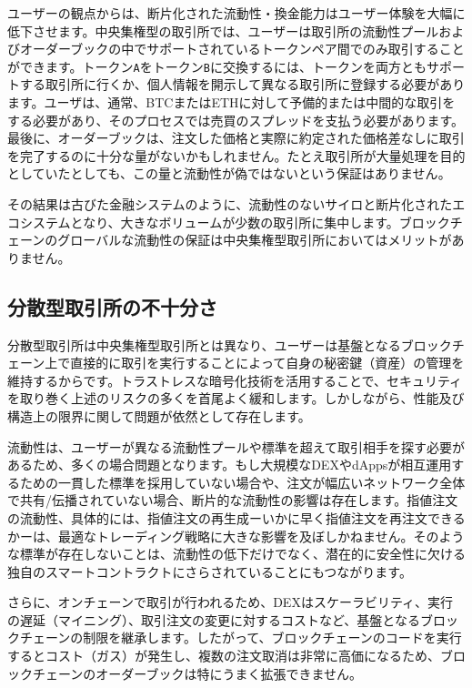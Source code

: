 \documentclass{article}
\begin{document}
\begin{multicols}{2}
ユーザーの観点からは、断片化された流動性・換金能力はユーザー体験を大幅に低下させます。中央集権型の取引所では、ユーザーは取引所の流動性プールおよびオーダーブックの中でサポートされているトークンペア間でのみ取引することができます。トークン\verb|A|をトークン\verb|B|に交換するには、トークンを両方ともサポートする取引所に行くか、個人情報を開示して異なる取引所に登録する必要があります。ユーザは、通常、BTCまたはETHに対して予備的または中間的な取引をする必要があり、そのプロセスでは売買のスプレッドを支払う必要があります。最後に、オーダーブックは、注文した価格と実際に約定された価格差なしに取引を完了するのに十分な量がないかもしれません。たとえ取引所が大量処理を目的としていたとしても、この量と流動性が偽ではないという保証はありません\cite{fakevolume}。

その結果は古びた金融システムのように、流動性のないサイロと断片化されたエコシステムとなり、大きなボリュームが少数の取引所に集中します。ブロックチェーンのグローバルな流動性の保証は中央集権型取引所においてはメリットがありません。

\subsection{分散型取引所の不十分さ}
分散型取引所は中央集権型取引所とは異なり、ユーザーは基盤となるブロックチェーン上で直接的に取引を実行することによって自身の秘密鍵（資産）の管理を維持するからです。トラストレスな暗号化技術を活用することで、セキュリティを取り巻く上述のリスクの多くを首尾よく緩和します。しかしながら、性能及び構造上の限界に関して問題が依然として存在します。

流動性は、ユーザーが異なる流動性プールや標準を超えて取引相手を探す必要があるため、多くの場合問題となります。もし大規模なDEXやdAppsが相互運用するための一貫した標準を採用していない場合や、注文が幅広いネットワーク全体で共有/伝播されていない場合、断片的な流動性の影響は存在します。指値注文の流動性、具体的には、指値注文の再生成ーいかに早く指値注文を再注文できるかーは、最適なトレーディング戦略に大きな影響を及ぼしかねません\cite{limitorderliquidity}。そのような標準が存在しないことは、流動性の低下だけでなく、潜在的に安全性に欠ける独自のスマートコントラクトにさらされていることにもつながります。

さらに、オンチェーンで取引が行われるため、DEXはスケーラビリティ、実行の遅延（マイニング）、取引注文の変更に対するコストなど、基盤となるブロックチェーンの制限を継承します。したがって、ブロックチェーンのコードを実行するとコスト（ガス）が発生し、複数の注文取消は非常に高価になるため、ブロックチェーンのオーダーブックは特にうまく拡張できません。


\end{multicols}
\end{document}
